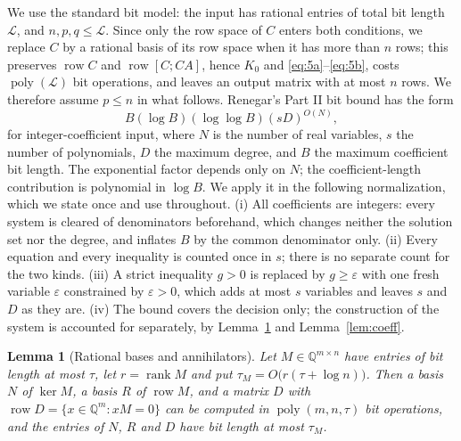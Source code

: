 \documentclass[journal]{IEEEtran}
\theoremstyle{plainn}
\newtheorem{lem}[thm]{Lemma}
\theoremstyle{remark}
\begin{document}
We use the standard bit model: the input has rational entries of total bit length $\mathcal L$,
and $n,p,q\le\mathcal L$. Since only the row space of $C$ enters both conditions, we replace $C$ by
a rational basis of its row space when it has more than $n$ rows; this preserves $\operatorname{row}C$
and $\operatorname{row}[C;CA]$, hence $K_0$ and \eqref{eq:5a}--\eqref{eq:5b}, costs
$\operatorname{poly}(\mathcal L)$ bit operations, and leaves an output matrix with at most $n$ rows.
We therefore assume $p\le n$ in what follows. Renegar's Part II bit bound
\cite{ren92} has the form
\begin{equation}\label{eq:rengar}
B(\log B)(\log\log B)(sD)^{O(N)},
\end{equation}
for integer-coefficient input, where $N$ is the number of real variables, $s$
the number of polynomials, $D$ the maximum degree, and $B$ the maximum
coefficient bit length. The exponential factor depends only on $N$; the
coefficient-length contribution is polynomial in $\log B$. We apply it in the following
normalization, which we state once and use throughout. (i) All coefficients are integers: every system
is cleared of denominators beforehand, which changes neither the solution set nor the degree, and
inflates $B$ by the common denominator only. (ii) Every equation and every inequality is counted once
in $s$; there is no separate count for the two kinds. (iii) A strict inequality $g>0$ is replaced by
$g\ge\varepsilon$ with one fresh variable $\varepsilon$ constrained by $\varepsilon>0$, which adds at
most $s$ variables and leaves $s$ and $D$ as they are. (iv) The bound covers the decision only; the
construction of the system is accounted for separately, by Lemma~\ref{lem:rationalbasis} and
Lemma~\ref{lem:coeff}.

\begin{lem}[Rational bases and annihilators]\label{lem:rationalbasis}
Let $M\in\mathbb Q^{m\times n}$ have entries of bit length at most $\tau$, let $r=\operatorname{rank}M$
and put $\tau_M=O\bigl(r(\tau+\log n)\bigr)$. Then a basis $N$ of $\ker M$, a basis $R$ of
$\operatorname{row}M$, and a matrix $D$ with $\operatorname{row}D=\{x\in\mathbb Q^m:xM=0\}$ can be
computed in $\operatorname{poly}(m,n,\tau)$ bit operations, and the entries of $N$, $R$ and $D$ have
bit length at most $\tau_M$.
\end{lem}
\end{document}
